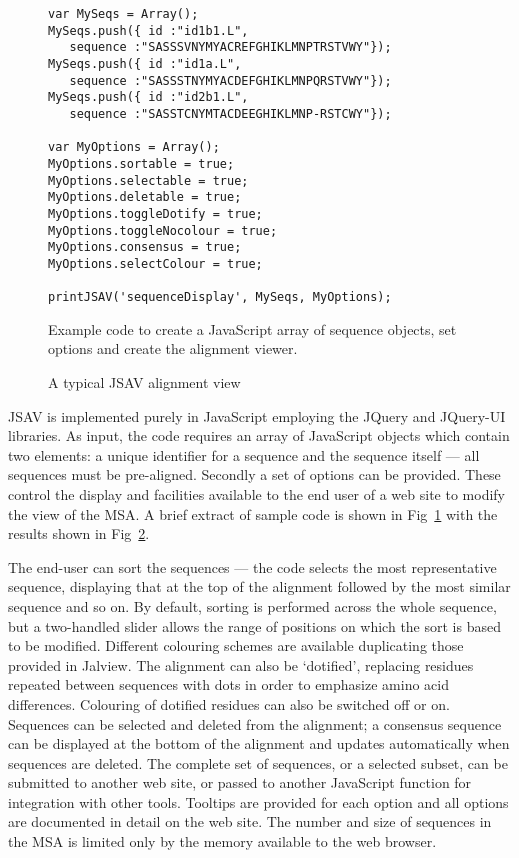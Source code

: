 \documentclass[a4]{bioinfo}
\begin{document}
\begin{figure}
\footnotesize
\begin{verbatim}
var MySeqs = Array();
MySeqs.push({ id :"id1b1.L",  
   sequence :"SASSSVNYMYACREFGHIKLMNPTRSTVWY"});
MySeqs.push({ id :"id1a.L",   
   sequence :"SASSSTNYMYACDEFGHIKLMNPQRSTVWY"});
MySeqs.push({ id :"id2b1.L",  
   sequence :"SASSTCNYMTACDEEGHIKLMNP-RSTCWY"});

var MyOptions = Array();
MyOptions.sortable = true;
MyOptions.selectable = true;
MyOptions.deletable = true;
MyOptions.toggleDotify = true;
MyOptions.toggleNocolour = true;
MyOptions.consensus = true;
MyOptions.selectColour = true;

printJSAV('sequenceDisplay', MySeqs, MyOptions);
\end{verbatim}
\caption{\label{fig:code}Example code to create a
JavaScript array of sequence objects, set options and 
create the alignment viewer.}
\end{figure}

\begin{figure}
\caption{\label{fig:demo}A typical JSAV alignment view}
\end{figure}


JSAV is implemented purely in JavaScript employing the JQuery and
JQuery-UI libraries. As input, the code requires an array of
JavaScript objects which contain two elements: a unique identifier for
a sequence and the sequence itself --- all sequences must be
pre-aligned.  Secondly a set of options can be provided. These control
the display and facilities available to the end user of a web site to
modify the view of the MSA.  A brief extract of sample code is shown
in Fig~\ref{fig:code} with the results shown in Fig~\ref{fig:demo}.

The end-user can sort the sequences --- the code selects the most
representative sequence, displaying that at the top of the alignment
followed by the most similar sequence and so on. By default, sorting
is performed across the whole sequence, but a two-handled slider
allows the range of positions on which the sort is based to be
modified. Different colouring schemes are available duplicating those
provided in Jalview. The alignment can also be `dotified', replacing
residues repeated between sequences with dots in order to emphasize
amino acid differences. Colouring of dotified residues can also be
switched off or on. Sequences can be selected and deleted from the
alignment; a consensus sequence can be displayed at the bottom of the
alignment and updates automatically when sequences are deleted. The
complete set of sequences, or a selected subset, can be submitted to
another web site, or passed to another JavaScript function for
integration with other tools. Tooltips are provided for each option
and all options are documented in detail on the web site. The number
and size of sequences in the MSA is limited only by the memory
available to the web browser.
\end{document}
